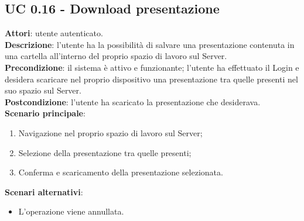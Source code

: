 \subsection{UC 0.16 - Download presentazione}{
	\label{uc0.16}
	\textbf{Attori}: utente autenticato.	\\
	\textbf{Descrizione}: l'utente ha la possibilità di salvare una presentazione contenuta in una cartella all'interno del proprio spazio di lavoro sul Server. \\
	\textbf{Precondizione}: il sistema è attivo e funzionante; l'utente ha effettuato il Login e desidera scaricare nel proprio dispositivo una presentazione tra quelle presenti nel suo spazio sul Server.	\\
	\textbf{Postcondizione}: l'utente ha scaricato la presentazione che desiderava.	\\
	\textbf{Scenario principale}:
	\begin{enumerate}
		\item Navigazione nel proprio spazio di lavoro sul Server;
		\item Selezione della presentazione tra quelle presenti;
		\item Conferma e scaricamento della presentazione selezionata.
	\end{enumerate}
	\textbf{Scenari alternativi}: 
	\begin{itemize}
		\item L'operazione viene annullata.
	\end{itemize}
	}
